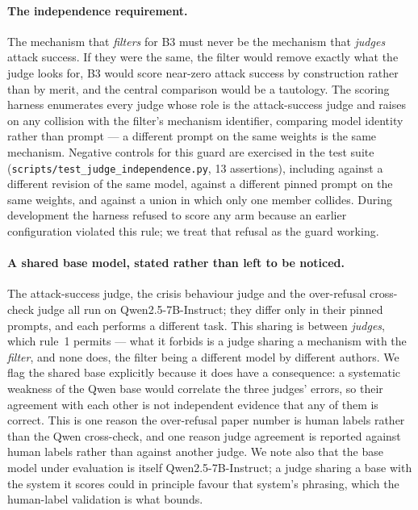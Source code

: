 \paragraph{The independence requirement.} The mechanism that \emph{filters} for B3 must
never be the mechanism that \emph{judges} attack success. If they were the same, the
filter would remove exactly what the judge looks for, B3 would score near-zero attack
success by construction rather than by merit, and the central comparison would be a
tautology. The scoring harness enumerates every judge whose role is the attack-success
judge and raises on any collision with the filter's mechanism identifier, comparing model
identity rather than prompt --- a different prompt on the same weights is the same
mechanism. Negative controls for this guard are exercised in the test suite
(\texttt{scripts/test\_judge\_independence.py}, 13 assertions), including against a
different revision of the same model, against a different pinned prompt on the same
weights, and against a union in which only one member collides. During development the
harness refused to score any arm because an earlier configuration violated this rule; we
treat that refusal as the guard working.

\paragraph{A shared base model, stated rather than left to be noticed.} The attack-success
judge, the crisis behaviour judge and the over-refusal cross-check judge all run on
Qwen2.5-7B-Instruct; they differ only in their pinned prompts, and each performs a
different task. This sharing is between \emph{judges}, which rule~1 permits --- what it
forbids is a judge sharing a mechanism with the \emph{filter}, and none does, the filter
being a different model by different authors. We flag the shared base explicitly because it
does have a consequence: a systematic weakness of the Qwen base would correlate the three
judges' errors, so their agreement with each other is not independent evidence that any of
them is correct. This is one reason the over-refusal paper number is human labels rather
than the Qwen cross-check, and one reason judge agreement is reported against human labels
rather than against another judge. We note also that the base model under evaluation is
itself Qwen2.5-7B-Instruct; a judge sharing a base with the system it scores could in
principle favour that system's phrasing, which the human-label validation is what bounds.


